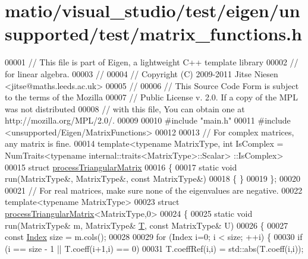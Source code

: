 \hypertarget{matio_2visual__studio_2test_2eigen_2unsupported_2test_2matrix__functions_8h_source}{}\section{matio/visual\+\_\+studio/test/eigen/unsupported/test/matrix\+\_\+functions.h}
\label{matio_2visual__studio_2test_2eigen_2unsupported_2test_2matrix__functions_8h_source}

\begin{DoxyCode}
00001 \textcolor{comment}{// This file is part of Eigen, a lightweight C++ template library}
00002 \textcolor{comment}{// for linear algebra.}
00003 \textcolor{comment}{//}
00004 \textcolor{comment}{// Copyright (C) 2009-2011 Jitse Niesen <jitse@maths.leeds.ac.uk>}
00005 \textcolor{comment}{//}
00006 \textcolor{comment}{// This Source Code Form is subject to the terms of the Mozilla}
00007 \textcolor{comment}{// Public License v. 2.0. If a copy of the MPL was not distributed}
00008 \textcolor{comment}{// with this file, You can obtain one at http://mozilla.org/MPL/2.0/.}
00009 
00010 \textcolor{preprocessor}{#include "main.h"}
00011 \textcolor{preprocessor}{#include <unsupported/Eigen/MatrixFunctions>}
00012 
00013 \textcolor{comment}{// For complex matrices, any matrix is fine.}
00014 template<typename MatrixType, int IsComplex = NumTraits<typename internal::traits<MatrixType>::Scalar>
      ::IsComplex>
00015 \textcolor{keyword}{struct }\hyperlink{structprocess_triangular_matrix}{processTriangularMatrix}
00016 \{
00017   \textcolor{keyword}{static} \textcolor{keywordtype}{void} run(MatrixType&, MatrixType&, \textcolor{keyword}{const} MatrixType&)
00018   \{ \}
00019 \};
00020 
00021 \textcolor{comment}{// For real matrices, make sure none of the eigenvalues are negative.}
00022 \textcolor{keyword}{template}<\textcolor{keyword}{typename} MatrixType>
00023 \textcolor{keyword}{struct }\hyperlink{structprocess_triangular_matrix}{processTriangularMatrix}<MatrixType,0>
00024 \{
00025   \textcolor{keyword}{static} \textcolor{keywordtype}{void} run(MatrixType& m, MatrixType& \hyperlink{group___sparse_core___module_class_eigen_1_1_triplet}{T}, \textcolor{keyword}{const} MatrixType& U)
00026   \{
00027     \textcolor{keyword}{const} \hyperlink{namespace_eigen_a62e77e0933482dafde8fe197d9a2cfde}{Index} size = m.cols();
00028 
00029     \textcolor{keywordflow}{for} (Index i=0; i < size; ++i) \{
00030       \textcolor{keywordflow}{if} (i == size - 1 || T.coeff(i+1,i) == 0)
00031         T.coeffRef(i,i) = std::abs(T.coeff(i,i));

\end{DoxyCode}
